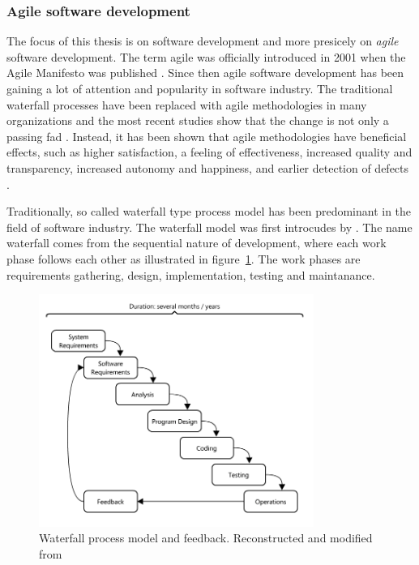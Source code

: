 \documentclass[english,12pt,a4paper,pdftex]{article}
\begin{document}
\subsubsection{Agile software development}

The focus of this thesis is on software development and more presicely on \emph{agile} software development. The term agile was officially introduced in 2001 when the Agile Manifesto was published \citep{agilemanifesto}. Since then agile software development has been gaining a lot of attention and popularity in software industry. The traditional waterfall processes have been replaced with agile methodologies in many organizations and the most recent studies show that the change is not only a passing fad \citep{laanti2011}. Instead, it has been shown that agile methodologies have beneficial effects, such as higher satisfaction, a feeling of effectiveness, increased quality and transparency, increased autonomy and happiness, and earlier detection of defects \citep{korhonen2012}.

Traditionally, so called waterfall type process model has been predominant in the field of software industry. The waterfall model was first introcudes by \citet{royce1970}. The name waterfall comes from the sequential nature of development, where each work phase follows each other as illustrated in figure~\ref{fig:waterfall}. The work phases are requirements gathering, design, implementation, testing and maintanance.

\begin{figure}[htb]
\begin{center}
\includegraphics[width=0.8\textwidth]{waterfall_reconstructed.png}
\end{center}
\caption{Waterfall process model and feedback. Reconstructed and modified from \citet{royce1970}}
\label{fig:waterfall}
\end{figure}
\end{document}
